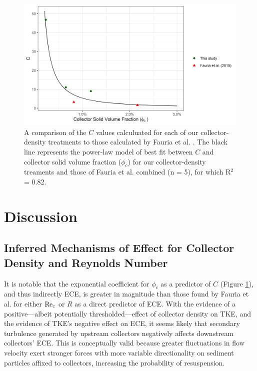 \documentclass[geosciences,article,submit,moreauthors,pdftex]{Definitions/mdpi}
\begin{document}
\begin{figure}[H]
\centering
\includegraphics[width=5in]{../pics/cphiplot.png}
\caption{A comparison of the $C$ values calculuated for each of our collector-density treatments to those calculated by Fauria et al. \cite{Fauria_2015}. The black line represents the power-law model of best fit between $C$ and collector solid volume fraction ($\phi_c$) for our collector-density treaments and those of Fauria et al. combined (n = 5), for which R$^2$ = 0.82.}
\label{fig:cphi}
\end{figure}   

\section{Discussion}

\subsection{Inferred Mechanisms of Effect for Collector Density and Reynolds Number}

It is notable that the exponential coefficient for $\phi_c$ as a predictor of $C$ (Figure \ref{fig:cphi}), and thus indirectly ECE, is greater in magnitude than those found by Fauria et al. \cite{Fauria_2015} for either $\mathrm{Re}_c$ or $R$ as a direct predictor of ECE. With the evidence of a positive---albeit potentially thresholded---effect of collector density on TKE, and the evidence of TKE's negative effect on ECE, it seems likely that secondary turbulence generated by upstream collectors negatively affects downstream collectors' ECE. This is conceptually valid because greater fluctuations in flow velocity exert stronger forces with more variable directionality on sediment particles affixed to collectors, increasing the probability of resuspension. 
\end{document}
